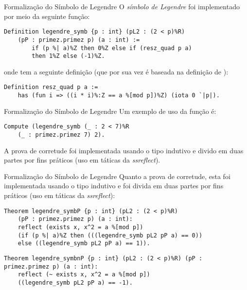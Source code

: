 \begin{frame}[fragile]{Formalização do Símbolo de Legendre}
    O \textit{símbolo de Legendre} foi implementado por meio da seguinte função:
        
        \begin{lstlisting}[language=coq,frame=single,tabsize=1]
Definition legendre_symb {p : int} (pL2 : (2 < p)%R) 
    (pP : primez.primez p) (a : int) :=
        if (p %| a)%Z then 0%Z else if (resz_quad p a)
        then 1%Z else (-1)%Z.
        \end{lstlisting}
        
        onde  tem a seguinte definição (que por sua vez é baseada na definição de ):
        
        \begin{lstlisting}[language=coq,frame=single,tabsize=1]
Definition resz_quad p a := 
    has (fun i => ((i * i)%:Z == a %[mod p])%Z) (iota 0 `|p|).
        \end{lstlisting}
    
\end{frame}

\begin{frame}[fragile]{Formalização do Símbolo de Legendre}
    Um exemplo de uso da função  é:
            \begin{lstlisting}[language=coq,frame=single,tabsize=1]
Compute (legendre_symb (_ : 2 < 7)%R 
    (_ : primez.primez 7) 2).
            \end{lstlisting}

    A prova de corretude foi implementada usando o tipo indutivo  e divido em duas partes por fins práticos (uso em táticas da \textit{ssreflect}).

\end{frame}

\begin{frame}[fragile]{Formalização do Símbolo de Legendre}
    Quanto a prova de corretude, esta foi implementada usando o tipo indutivo  e foi divida em duas partes por fins práticos (uso em táticas da \textit{ssreflect}):
    \newline
        \begin{lstlisting}[language=coq,frame=single,tabsize=1, escapechar=@]
Theorem legendre_symbP {p : int} (pL2 : (2 < p)%R) 
    (pP : primez.primez p) (a : int):
    reflect (exists x, x^2 = a %[mod p]) 
    (if (p %| a)%Z then (((legendre_symb pL2 pP a) == 0)) 
    else ((legendre_symb pL2 pP a) == 1)).
        \end{lstlisting}
            
        \begin{lstlisting}[language=coq,frame=single,tabsize=1, escapechar=@]
Theorem legendre_symbnP {p : int} (pL2 : (2 < p)%R) (pP : primez.primez p) (a : int):
    reflect (~ exists x, x^2 = a %[mod p]) 
    ((legendre_symb pL2 pP a) == -1).
        \end{lstlisting}
\end{frame}

